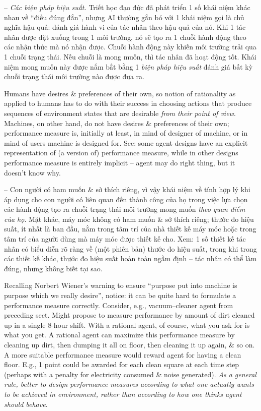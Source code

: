 \documentclass{article}
\begin{document}
\begin{itemize}
\begin{itemize}
\begin{itemize}
\begin{itemize}
				-- {\it Các biện pháp hiệu suất.} Triết học đạo đức đã phát triển 1 số khái niệm khác nhau về ``điều đúng đắn'', nhưng AI thường gắn bó với 1 khái niệm gọi là chủ nghĩa hậu quả: đánh giá hành vi của tác nhân theo hậu quả của nó. Khi 1 tác nhân được đặt xuống trong 1 môi trường, nó sẽ tạo ra 1 chuỗi hành động theo các nhận thức mà nó nhận được. Chuỗi hành động này khiến môi trường trải qua 1 chuỗi trạng thái. Nếu chuỗi là mong muốn, thì tác nhân đã hoạt động tốt. Khái niệm mong muốn này được nắm bắt bằng 1 {\it biện pháp hiệu suất} đánh giá bất kỳ chuỗi trạng thái môi trường nào được đưa ra.

				Humans have desires \& preferences of their own, so notion of rationality as applied to humans has to do with their success in choosing actions that produce sequences of environment states that are desirable {\it from their point of view}. Machines, on other hand, do not have desires \& preferences of their own; performance measure is, initially at least, in mind of designer of machine, or in mind of users machine is designed for. See: some agent designs have an explicit representation of (a version of) performance measure, while in other designs performance measure is entirely implicit -- agent may do right thing, but it doesn't know why.

				-- Con người có ham muốn \& sở thích riêng, vì vậy khái niệm về tính hợp lý khi áp dụng cho con người có liên quan đến thành công của họ trong việc lựa chọn các hành động tạo ra chuỗi trạng thái môi trường mong muốn {\it theo quan điểm của họ}. Mặt khác, máy móc không có ham muốn \& sở thích riêng; thước đo hiệu suất, ít nhất là ban đầu, nằm trong tâm trí của nhà thiết kế máy móc hoặc trong tâm trí của người dùng mà máy móc được thiết kế cho. Xem: 1 số thiết kế tác nhân có biểu diễn rõ ràng về (một phiên bản) thước đo hiệu suất, trong khi trong các thiết kế khác, thước đo hiệu suất hoàn toàn ngầm định -- tác nhân có thể làm đúng, nhưng không biết tại sao.

				Recalling {\sc Norbert Wiener}'s warning to ensure ``purpose put into machine is purpose which we really desire'', notice: it can be quite hard to formulate a performance measure correctly. Consider, e.g., vacuum--cleaner agent from preceding sect. Might propose to measure performance by amount of dirt cleaned up in a single 8-hour shift. With a rational agent, of course, what you ask for is what you get. A rational agent can maximize this performance measure by cleaning up dirt, then dumping it all on floor, then cleaning it up again, \& so on. A more suitable performance measure would reward agent for having a clean floor. E.g., 1 point could be awarded for each clean square at each time step (perhaps with a penalty for electricity consumed \& noise generated). {\it As a general rule, better to design performance measures according to what one actually wants to be achieved in environment, rather than according to how one thinks agent should behave}.


\end{itemize}
\end{itemize}
\end{itemize}
\end{itemize}
\end{document}
